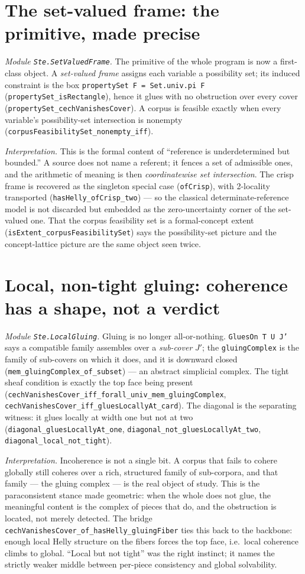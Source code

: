 \documentclass[11pt]{article}
\newcommand{\code}[1]{\texttt{#1}}
\begin{document}
\section{The set-valued frame: the primitive, made precise}
\emph{Module \code{Ste.SetValuedFrame}.}
The primitive of the whole program is now a first-class object.  A
\emph{set-valued frame} assigns each variable a possibility set; its
induced constraint is the box \code{propertySet F = Set.univ.pi F}
(\code{propertySet\_isRectangle}), hence it glues with no obstruction over
every cover (\code{propertySet\_cechVanishesCover}).  A corpus is feasible
exactly when every variable's possibility-set intersection is nonempty
(\code{corpusFeasibilitySet\_nonempty\_iff}).

\emph{Interpretation.} This is the formal content of ``reference is
underdetermined but bounded.''  A source does not name a referent; it
fences a set of admissible ones, and the arithmetic of meaning is then
\emph{coordinatewise set intersection}.  The crisp frame is recovered as
the singleton special case (\code{ofCrisp}), with 2-locality transported
(\code{hasHelly\_ofCrisp\_two}) --- so the classical determinate-reference
model is not discarded but embedded as the zero-uncertainty corner of the
set-valued one.  That the corpus feasibility set is a formal-concept
extent (\code{isExtent\_corpusFeasibilitySet}) says the possibility-set
picture and the concept-lattice picture are the same object seen twice.

\section{Local, non-tight gluing: coherence has a shape, not a verdict}
\emph{Module \code{Ste.LocalGluing}.}
Gluing is no longer all-or-nothing.  \code{GluesOn T U J'} says a
compatible family assembles over a \emph{sub-cover} $J'$; the
\code{gluingComplex} is the family of sub-covers on which it does, and it
is downward closed (\code{mem\_gluingComplex\_of\_subset}) --- an abstract
simplicial complex.  The tight sheaf condition is exactly the top face
being present
(\code{cechVanishesCover\_iff\_forall\_univ\_mem\_gluingComplex},
\code{cechVanishesCover\_iff\_gluesLocallyAt\_card}).  The diagonal is the
separating witness: it glues locally at width one but not at two
(\code{diagonal\_gluesLocallyAt\_one},
\code{diagonal\_not\_gluesLocallyAt\_two},
\code{diagonal\_local\_not\_tight}).

\emph{Interpretation.} Incoherence is not a single bit.  A corpus that
fails to cohere globally still coheres over a rich, structured family of
sub-corpora, and that family --- the gluing complex --- is the real
object of study.  This is the paraconsistent stance made geometric: when
the whole does not glue, the meaningful content is the complex of pieces
that do, and the obstruction is located, not merely detected.  The
bridge \code{cechVanishesCover\_of\_hasHelly\_gluingFiber} ties this back
to the backbone: enough local Helly structure on the fibers forces the
top face, i.e.\ local coherence climbs to global.  ``Local but not
tight'' was the right instinct; it names the strictly weaker middle
between per-piece consistency and global solvability.
\end{document}
